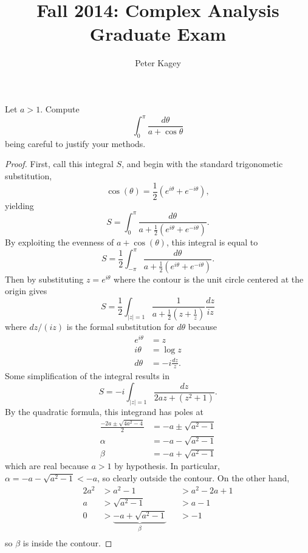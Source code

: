 \documentclass{article}
\newenvironment{problem}[2][Problem]{\begin{trivlist}
\item[\hskip \labelsep {\bfseries #1}\hskip \labelsep {\bfseries #2.}]}{\end{trivlist}}
\begin{document}
\title{Fall 2014: Complex Analysis Graduate Exam}
\author{Peter Kagey}

\maketitle

\begin{problem}{1}
  Let $a > 1$. Compute \[
    \int_0^\pi \frac{d\theta}{a + \cos\theta}
  \] being careful to justify your methods.
\end{problem}

\begin{proof}
  First, call this integral $S$, and begin with the standard trigonometic substitution, \[
    \cos(\theta) = \frac{1}{2}(e^{i\theta} + e^{-i\theta}),
  \] yielding \[
    S = \int_0^\pi \frac{d\theta}{a + \frac{1}{2}(e^{i\theta} + e^{-i\theta})}.
  \]
  By exploiting the evenness of $a + \cos(\theta)$, this integral is equal to \[
    S = \frac{1}{2}\int_{-\pi}^\pi \frac{d\theta}{a + \frac{1}{2}(e^{i\theta} + e^{-i\theta})}.
  \]
  Then by substituting $z = e^{i\theta}$ where the contour is the unit circle
  centered at the origin gives \[
    S = \frac{1}{2}\int_{|z| = 1} \frac{1}{a + \frac{1}{2}\left(z + \frac{1}{z}\right)}\frac{dz}{iz}
  \] where $dz/(iz)$ is the formal substitution for $d\theta$ because \begin{align*}
    e^{i\theta} &= z \\
    i\theta &= \log z \\
    d\theta &= -i\frac{dz}{z}.
  \end{align*}
  Some simplification of the integral results in \[
    S = -i\int_{|z| = 1} \frac{dz}{2az + \left(z^2 + 1\right)}.
  \]
  By the quadratic formula, this integrand has poles at \begin{align*}
    \frac{-2a \pm \sqrt{4a^2-4}}{2} &= -a \pm \sqrt{a^2 - 1} \\
    \alpha &= -a - \sqrt{a^2 - 1}\\
    \beta &= -a + \sqrt{a^2 - 1}
  \end{align*} which are real because $a > 1$ by hypothesis. In particular,
  $\alpha = -a - \sqrt{a^2 - 1} < -a$, so clearly outside the contour.
  On the other hand, \begin{alignat*}{2}
    a^2 &> a^2 - 1      &&> a^2 - 2a + 1 \\
    a &> \sqrt{a^2 - 1} &&> a - 1 \\
    0 &> \underbrace{-a + \sqrt{a^2 - 1}}_\beta &&> -1 \\
  \end{alignat*} so $\beta$ is inside the contour.


\end{proof}
\end{document}
